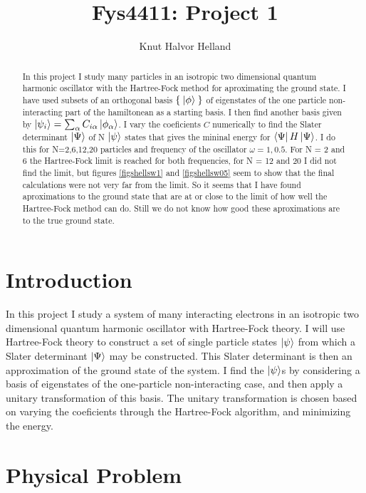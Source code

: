 \documentclass[a4paper,english,12pt]{article}
\title{Fys4411: Project 1}
\author{Knut Halvor Helland}
\begin{document}
\maketitle{}

\begin{abstract}
  In this project I study many particles in an isotropic two dimensional quantum harmonic oscillator with the Hartree-Fock method for aproximating
  the ground state.
  I have used subsets of an orthogonal basis \(\Set{\Ket{\phi}}\) of eigenstates of the one particle non-interacting part of the hamiltonean
  as a starting basis. I then find another basis given by \(\ket{\psi_i} = \sum_\alpha C_{i\alpha}\ket{\phi_\alpha}\). I vary the coeficients $C$
  numerically
  to find the Slater determinant $\Ket{\Psi}$ of N $\ket{\psi}$ states that gives the mininal energy for $\Bra{\Psi}H\Ket{\Psi}$. I do this
  for N=2,6,12,20 particles and frequency of the oscillator $\omega = 1,0.5$. For N = 2 and 6 the Hartree-Fock limit is reached for both frequencies,
  for N = 12 and 20 I did not find the limit, but figures \ref{figshellsw1} and \ref{figshellsw05} seem to show that the final calculations were not
  very far from the limit. So it seems that I have found aproximations to the ground state that are at or close to the limit of how well
  the Hartree-Fock method can do. Still we do not know how good these aproximations are to the true ground state.
  

\end{abstract}

\section{Introduction}

In this project I study a system of many interacting electrons in an isotropic two dimensional quantum harmonic oscillator with Hartree-Fock theory.
I will use Hartree-Fock theory to construct a set of single particle states $\ket{\psi}$ from which a Slater determinant $\Ket{\Psi}$
may be constructed. This Slater determinant is then an approximation of the ground state of the system. I find the $\ket{\psi}$s by considering
a basis of eigenstates of the one-particle non-interacting case, and then apply a unitary transformation of this basis. The unitary transformation
is chosen based on varying the coeficients through the Hartree-Fock algorithm, and minimizing the energy.

\section{Physical Problem}
\end{document}
